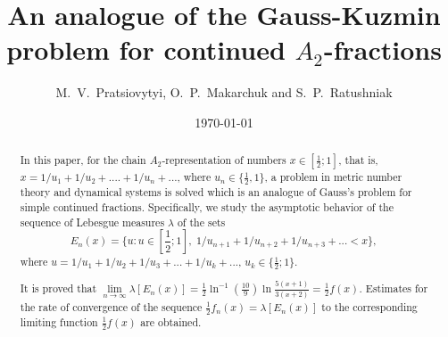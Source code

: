 \documentclass[11pt]{amsart}
\theoremstyle{plain}
\theoremstyle{remark}
\begin{document}
\title[]{An analogue of the Gauss-Kuzmin problem
 for continued $A_{2}$-fractions
}
\author[M.\ V.\ Pratsiovytyi, O.\ P.\ Makarchuk and 
S.\ P.\ Ratushniak]{ M.\ V.\ Pratsiovytyi, O.\ P.\ Makarchuk and S.\ P.\ Ratushniak}

\newcommand{\eacr}{\newline\indent}

\address{M.V. Pratsiovytyi\eacr
Institute of Mathematics of NASU,
 Dragomanov Ukrainian State University, Kyiv,
Ukraine\acr ORCID 0000-0001-6130-9413}

\address{O.P. Makarchuk\eacr
Volodymyr Vynnychenko Central Ukrainian State University,
Institute of Mathematics of NASU
\acr ORCID 0000-0002-1001-8568}

\address{S.P. Ratushniak\eacr
Institute of Mathematics of NASU,
 Dragomanov Ukrainian State University, Kyiv,
Ukraine\acr ORCID 0009-0005-2849-6233}




\date{\today}

\newcommand{\acr}{\newline\indent}


\begin{abstract}
In this paper, for the chain $A_2$-representation of numbers $x\in[\frac{1}{2};1]$, that is, $x=1/u_1+1/u_2+....+1/u_n+...$, where $u_n\in \{\frac{1}{2},1\}$, a problem in metric number theory and dynamical systems is solved which is an analogue of Gauss’s problem for simple continued fractions. Specifically, we study the asymptotic behavior of the sequence of Lebesgue measures $\lambda$ of the sets
\[E_n(x)=\{u: u\in [\frac{1}{2};1], \; 1/u_{n+1}+1/u_{n+2}+1/u_{n+3}+...<x\},\]
where $u= 1/u_{1}+1/u_{2}+1/u_{3}+...+1/u_{k}+...$, $u_k\in \{\frac{1}{2};1\}$.

It is proved that $\lim\limits_{n\to\infty}\lambda[E_n(x)]=\frac{1}{2}\ln^{-1}\left(\frac{10}{9}\right)\ln\frac{5(x+1)}{3(x+2)}=\frac{1}{2}f(x)$. Estimates for the rate of convergence of the sequence $\frac{1}{2}f_n(x)=\lambda[E_n(x)]$ to the corresponding limiting function $\frac{1}{2}f(x)$ are obtained.
\end{abstract}
\end{document}
